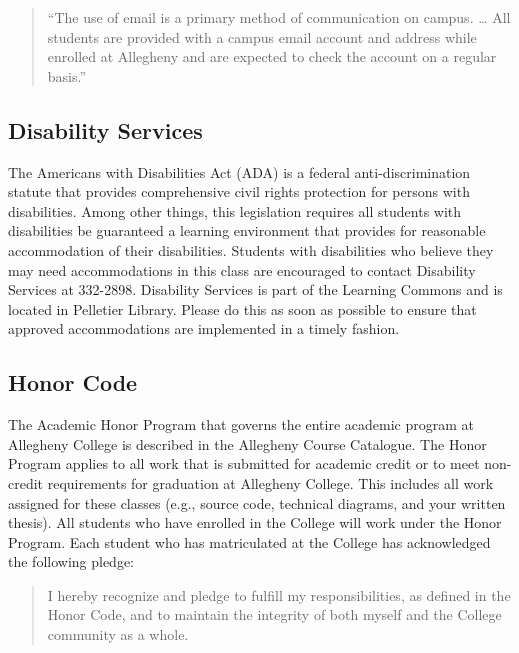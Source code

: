 \vspace*{-.1in}
\begin{quote}
``The use of email is a primary method of communication on campus. \ldots
All students are provided with a campus email account and address while
enrolled at Allegheny and are expected to check the account on a regular
basis.'' 
\end{quote}
\vspace*{-.3in}

\subsection*{Disability Services}

The Americans with Disabilities Act (ADA) is a federal anti-discrimination statute that provides comprehensive civil
rights protection for persons with disabilities.  Among other things, this legislation requires all students with
disabilities be guaranteed a learning environment that provides for reasonable accommodation of their disabilities.
Students with disabilities who believe they may need accommodations in this class are encouraged to contact Disability
Services at 332-2898.  Disability Services is part of the Learning Commons and is located in Pelletier Library.
Please do this as soon as possible to ensure that approved accommodations are implemented in a timely fashion.

\subsection*{Honor Code}

The Academic Honor Program that governs the entire academic program at Allegheny College is described in the Allegheny
Course Catalogue.  The Honor Program applies to all work that is submitted for academic credit or to meet non-credit
requirements for graduation at Allegheny College.  This includes all work assigned for these classes (e.g., source code,
technical diagrams, and your written thesis).  All students who have enrolled in the College will work under the Honor
Program.  Each student who has matriculated at the College has acknowledged the following pledge:

\vspace*{-.1in}
\begin{quote}
I hereby recognize and pledge to fulfill my responsibilities, as defined in the Honor Code, and to maintain the
integrity of both myself and the College community as a whole.  
\end{quote}
\vspace*{-.15in}

